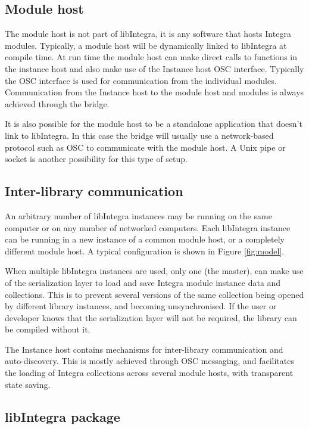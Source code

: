 \documentclass{article}
\begin{document}
\subsection{Module host}\label{subsec:module_host}

The module host is not part of libIntegra, it is any software that hosts Integra modules. Typically, a module host will be dynamically linked to libIntegra at compile time. At run time the module host can make direct calls to functions in the instance host and also make use of the Instance host OSC interface. Typically the OSC interface is used for communication from the individual modules.  Communication from the Instance host to the module host and modules is always achieved through the bridge.

It is also possible for the module host to be a standalone application that doesn't link to libIntegra. In this case the bridge will usually use a network-based protocol such as OSC to communicate with the module host. A Unix pipe or socket is another possibility for this type of setup.

\subsection{Inter-library communication}\label{subsec:interlib}

An arbitrary number of libIntegra instances may be running on the same computer or on any number of networked computers. Each libIntegra instance can be running in a new instance of a common module host, or a completely different module host. A typical configuration is shown in Figure \ref{fig:model}. 

When multiple libIntegra instances are used, only one (the master), can make use of the serialization layer to load and save Integra module instance data and collections. This is to prevent several versions of the same collection being opened by different library instances, and becoming unsynchronised. If the user or developer knows that the serialization layer will not be required, the library can be compiled without it.

The Instance host contains mechanisms for inter-library communication and auto-discovery. This is mostly achieved through OSC messaging, and facilitates the loading of Integra collections across several module hosts, with transparent state saving.

\subsection{libIntegra package}\label{subsec:cli}
\end{document}
